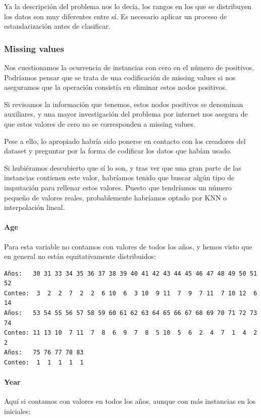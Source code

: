 Ya la descripción del problema nos lo decía, los rangos en los que se distribuyen los datos son muy diferentes entre sí. Es necesario aplicar un proceso de estandarización antes de clasificar.

\subsubsection{Missing values}

Nos cuestionamos la ocurrencia de instancias con cero en el número de positivos. Podríamos pensar que se trata de una codificación de missing values si nos aseguramos que la operación consistía en eliminar estos nodos positivos.

\vspace{\baselineskip}

Si revisamos la información que tenemos, estos nodos positivos se denominan auxiliares, y una mayor investigación del problema por internet nos asegura de que estos valores de cero no se corresponden a missing values.

Pese a ello, lo apropiado habría sido ponerse en contacto con los creadores del dataset y preguntar por la forma de codificar los datos que habían usado.

\vspace{\baselineskip}

Si hubiéramos descubierto que sí lo son, y tras ver que una gran parte de las instancias contienen este valor, habríamos tenido que buscar algún tipo de imputación para rellenar estos valores. Puesto que tendríamos un número pequeño de valores reales, probablemente habríamos optado por KNN o interpolación lineal.

\paragraph{Age}
Para esta variable no contamos con valores de todos los años, y hemos visto que en general no están equitativamente distribuidos:

\begin{verbatim}
Años:   30 31 33 34 35 36 37 38 39 40 41 42 43 44 45 46 47 48 49 50 51 52
Conteo:  3  2  2  7  2  2  6 10  6  3 10  9 11  7  9  7 11  7 10 12  6 14
Años:   53 54 55 56 57 58 59 60 61 62 63 64 65 66 67 68 69 70 71 72 73 74
Conteo: 11 13 10  7 11  7  8  6  9  7  8  5 10  5  6  2  4  7  1  4  2  2
Años:   75 76 77 78 83
Conteo:  1  1  1  1  1
\end{verbatim}

\paragraph{Year}
Aquí si contamos con valores en todos los años, aunque con más instancias en los iniciales:


